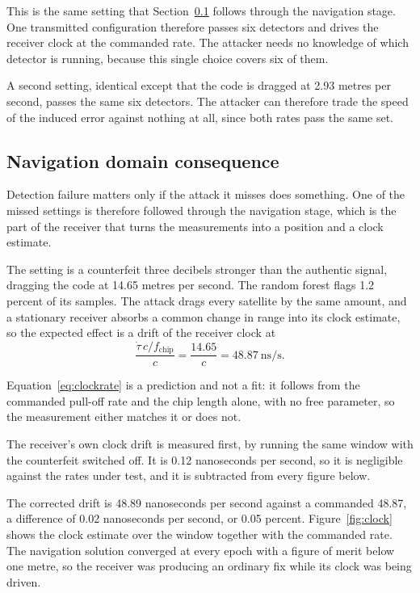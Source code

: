 This is the same setting that Section~\ref{sec:res_nav} follows through the navigation
stage. One transmitted configuration therefore passes six detectors and drives the
receiver clock at the commanded rate. The attacker needs no knowledge of which detector
is running, because this single choice covers six of them.

A second setting, identical except that the code is dragged at 2.93 metres per second,
passes the same six detectors. The attacker can therefore trade the speed of the induced
error against nothing at all, since both rates pass the same set.

\subsection{Navigation domain consequence}
\label{sec:res_nav}

Detection failure matters only if the attack it misses does something. One of the missed
settings is therefore followed through the navigation stage, which is the part of the
receiver that turns the measurements into a position and a clock estimate.

The setting is a counterfeit three decibels stronger than the authentic signal, dragging
the code at 14.65 metres per second. The random forest flags 1.2 percent of its samples.
The attack drags every satellite by the same amount, and a stationary receiver absorbs a
common change in range into its clock estimate, so the expected effect is a drift of the
receiver clock at
\begin{equation}
\frac{\dot\tau \, c/f_\mathrm{chip}}{c} = \frac{14.65}{c} = 48.87~\mathrm{ns/s}.
\label{eq:clockrate}
\end{equation}

Equation~\ref{eq:clockrate} is a prediction and not a fit: it follows from the commanded
pull-off rate and the chip length alone, with no free parameter, so the measurement either
matches it or does not.

The receiver's own clock drift is measured first, by running the same window with the
counterfeit switched off. It is 0.12 nanoseconds per second, so it is negligible against
the rates under test, and it is subtracted from every figure below.

The corrected drift is 48.89 nanoseconds per second against a commanded 48.87, a
difference of 0.02 nanoseconds per second, or 0.05 percent. Figure~\ref{fig:clock} shows the clock
estimate over the window together with the commanded rate. The navigation solution
converged at every epoch with a figure of merit below one metre, so the receiver was
producing an ordinary fix while its clock was being driven.

